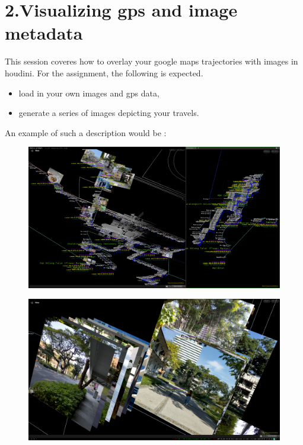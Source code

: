 \documentclass[11pt, a4paper, twoside]{article}
\begin{document}
	\newpage
	\section*{2.Visualizing gps and image metadata}
	
This session coveres how to overlay your google maps trajectories with images in houdini. For the assignment, the
following is expected.

	\begin{itemize}
		\item load in your own images and gps data, 
		\item generate a series of images depicting your travels.
	\end{itemize}	
	An example of such a description would be :

	\begin{figure}[H]
		\includegraphics[width=\textwidth]{media/mapping_bkk.png}
	\end{figure}

	\begin{figure}[H]
		\includegraphics[width=\textwidth]{media/mapping_bkk2.png}
	\end{figure}
\end{document}
